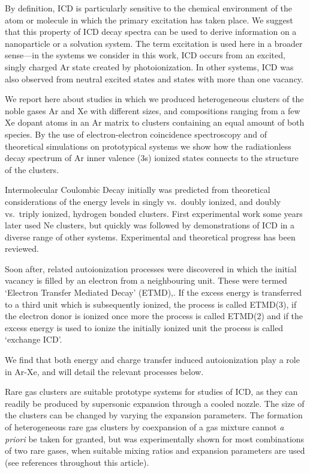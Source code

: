 \documentclass[journal=jpccck,manuscript=article]{achemso}
\begin{document}
By definition, ICD is particularly sensitive to the chemical 
environment of the atom or molecule in which the primary 
excitation has taken place. We suggest that this property of ICD 
decay spectra can be used to derive information on a nanoparticle 
or a solvation system. 
The term excitation is used here in a broader sense---in the
systems we consider in this work, ICD occurs from an excited, singly 
charged Ar state created by photoionization.
In other systems, ICD was also observed from neutral excited
states and states with more than one vacancy.

We report here about studies 
in which we produced heterogeneous clusters of the noble gases Ar 
and Xe with different sizes, and compositions ranging from a few 
Xe dopant atoms in an Ar matrix to clusters containing an equal 
amount of both species. By the use of electron-electron 
coincidence spectroscopy and of theoretical simulations on 
prototypical systems we show how the radiationless decay spectrum 
of Ar inner valence (3s) ionized states connects to the structure 
of the clusters.

Intermolecular Coulombic Decay initially was predicted from 
theoretical considerations of the energy levels in singly vs.\  
doubly ionized, and doubly vs.\ triply ionized, hydrogen bonded 
clusters.\cite{cederbaum} First experimental work some years 
later used Ne clusters,\cite{marburger,jahnkenedimer} but quickly 
was followed by demonstrations of ICD in a diverse range of other 
systems. Experimental and theoretical progress has been reviewed.
\cite{hergenhahn_review, averbukh_review, jahnke_review}

Soon after, related 
autoionization processes were discovered
in which the initial vacancy is filled by an electron from a neighbouring unit.
These were termed `Electron Transfer Mediated Decay' 
 (ETMD),\cite{zobeley,mueller,sakai,foerstel}.
If the excess energy is transferred to a third unit which is subsequently
ionized, the process is called ETMD(3), if the electron donor is ionized once
more the process is called ETMD(2) and if the excess energy is used to
ionize the initially ionized unit the process is called
`exchange ICD'. \cite{santrarev,jahnkesat}

We find that both energy and charge transfer induced 
autoionization play a role in Ar-Xe, and will detail the 
relevant processes below.

Rare gas clusters are suitable prototype systems for studies of
ICD, as they can readily be produced by supersonic 
expansion through a cooled nozzle. 
The size of the clusters can be changed by varying the expansion parameters.
The formation of heterogeneous rare gas clusters by coexpansion of a gas mixture cannot {\it a priori} be taken for granted, but was experimentally shown for most combinations of two rare gases, when suitable mixing ratios and expansion parameters are used (see references throughout this article).
\end{document}
